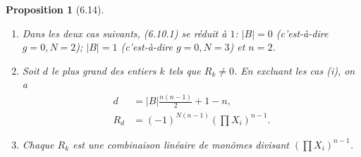 \documentclass[10pt]{article}
\theoremstyle{deligne}
\newtheorem*{proposition*}{Proposition}
\begin{document}
\begin{proposition*}[6.14]
\begin{enumerate}[label=(\roman*)]
\item Dans les deux cas suivants, (6.10.1) se réduit à $1$: $|B|=0$ (c'est-à-dire $g=0,N=2$); $|B|=1$ (c'est-à-dire $g=0,N=3$) et $n=2$.
\item Soit $d$ le plus grand des entiers $k$ tels que $R_k\ne0$. En excluant les cas (i), on a
\begin{align}
d&=|B|\frac{n(n-1)}{2}+1-n,\tag{6.14.1}\\
R_d&=(-1)^{N(n-1)}\left(\prod X_i\right)^{n-1}.\tag{6.14.2}
\end{align}
\item Chaque $R_k$ est une combinaison linéaire de monômes divisant $\left(\prod X_i\right)^{n-1}$.
\end{enumerate}
\end{proposition*}
\end{document}
